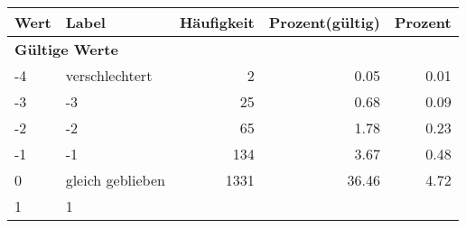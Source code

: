      \begin{longtable}{lXrrr}
     \toprule
     \textbf{Wert} & \textbf{Label} & \textbf{Häufigkeit} & \textbf{Prozent(gültig)} & \textbf{Prozent} \\
     \endhead
     \midrule
     \multicolumn{5}{l}{\textbf{Gültige Werte}}\\

     -4 &
     \multicolumn{1}{X}{ verschlechtert   } &


       \num{2} &
       \num[round-mode=places,round-precision=2]{0,05} &
         \num[round-mode=places,round-precision=2]{0,01} \\

     -3 &
     \multicolumn{1}{X}{ -3   } &


       \num{25} &
       \num[round-mode=places,round-precision=2]{0,68} &
         \num[round-mode=places,round-precision=2]{0,09} \\

     -2 &
     \multicolumn{1}{X}{ -2   } &


       \num{65} &
       \num[round-mode=places,round-precision=2]{1,78} &
         \num[round-mode=places,round-precision=2]{0,23} \\

     -1 &
     \multicolumn{1}{X}{ -1   } &


       \num{134} &
       \num[round-mode=places,round-precision=2]{3,67} &
         \num[round-mode=places,round-precision=2]{0,48} \\

     0 &
     \multicolumn{1}{X}{ gleich geblieben   } &


       \num{1331} &
       \num[round-mode=places,round-precision=2]{36,46} &
         \num[round-mode=places,round-precision=2]{4,72} \\

     1 &
     \multicolumn{1}{X}{ 1   } &



\end{longtable}
